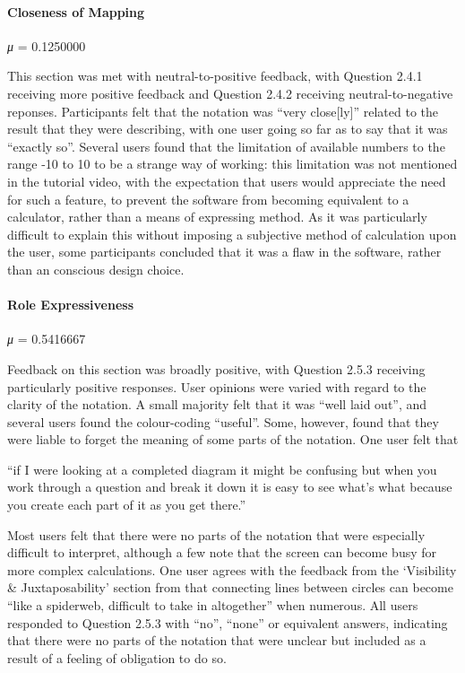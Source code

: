 \documentclass[12pt,twoside,notitlepage,xetex]{report}
\begin{document}
\paragraph{Closeness of Mapping}\hfill

\emph{μ} = 0.1250000

This section was met with neutral-to-positive feedback, with Question 2.4.1 receiving more positive feedback and Question 2.4.2 receiving neutral-to-negative reponses.  Participants felt that the notation was ``very close[ly]'' related to the result that they were describing, with one user going so far as to say that it was ``exactly so''.  Several users found that the limitation of available numbers to the range -10 to 10 to be a strange way of working: this limitation was not mentioned in the tutorial video, with the expectation that users would appreciate the need for such a feature, to prevent the software from becoming equivalent to a calculator, rather than a means of expressing method.  As it was particularly difficult to explain this without imposing a subjective method of calculation upon the user, some participants concluded that it was a flaw in the software, rather than an conscious design choice.

\paragraph{Role Expressiveness}\hfill

\emph{μ} = 0.5416667

Feedback on this section was broadly positive, with Question 2.5.3 receiving particularly positive responses.  User opinions were varied with regard to the clarity of the notation.  A small majority felt that it was ``well laid out'', and several users found the colour-coding ``useful''.  Some, however, found that they were liable to forget the meaning of some parts of the notation.  One user felt that
\begin{center}
\parbox[c]{\textwidth-2cm}{
\small
``if I were looking at a completed diagram it might be confusing but when you work through a question and break it down it is easy to see what's what because you create each part of it as you get there.''
}
\end{center}
Most users felt that there were no parts of the notation that were especially difficult to interpret, although a few note that the screen can become busy for more complex calculations.  One user agrees with the feedback from the `Visibility \& Juxtaposability' section from that connecting lines between circles can become ``like a spiderweb, difficult to take in altogether'' when numerous.  All users responded to Question 2.5.3 with ``no'', ``none'' or equivalent answers, indicating that there were no parts of the notation that were unclear but included as a result of a feeling of obligation to do so.
\end{document}
